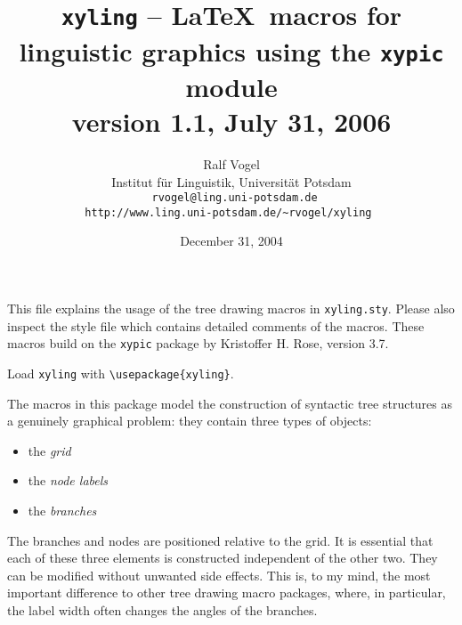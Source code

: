 \documentclass[12pt,a4paper]{article}
\title{\texttt{xyling} -- \LaTeX\ macros for linguistic graphics using the
  \texttt{xypic} module\\ version 1.1, July 31, 2006}
\author{Ralf Vogel\\Institut f\"ur Linguistik, Universit\"at Potsdam\\\tt
  rvogel@ling.uni-potsdam.de\\\tt http://www.ling.uni-potsdam.de/\~{}rvogel/xyling
} \date{December 31, 2004}
\begin{document}
\maketitle

This file explains the usage of the tree drawing macros in
\texttt{xyling.sty}. Please also inspect the style file which contains detailed
comments of the macros. These macros build on the \texttt{xypic} package by
Kristoffer H. Rose, version 3.7.


Load \texttt{xyling} with \verb|\usepackage{xyling}|.

The macros in this package model the construction of syntactic tree structures
as a genuinely graphical problem: they contain three types of objects:

\begin{itemize}
\item the \emph{grid}
\item the \emph{node labels}
\item the \emph{branches}
\end{itemize}

The branches and nodes are positioned relative to the grid. It is
essential that each of these three elements is constructed independent of the
other two. They can be modified without unwanted side effects. This
is, to my mind, the most important difference to other tree drawing macro
packages, where, in particular, the label width often changes the angles of the
branches.
\end{document}
